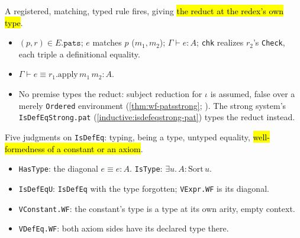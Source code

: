 \begin{definition}
\label{rule:isdefeq-pat}
\leanok
{}

 A registered, matching, typed rule fires, giving \hl{the reduct at the
redex's own type}.
\begin{itemize}
\item {} $(p,r)\in E.\texttt{pats}$; $e$ matches $p$ ($m_1,m_2$); $\Gamma\vdash e:A$;
  \texttt{chk} realizes $r_2$'s \texttt{Check}, each triple a definitional equality.
\item {} $\Gamma \vdash e \equiv r_1.\mathrm{apply}\,m_1\,m_2 : A$.
\item {} No premise types the reduct: subject reduction for $\iota$ is assumed,
  false over a merely \texttt{Ordered} environment (\ref{thm:wf-patsstrong};
  ). The strong system's
  \texttt{IsDefEqStrong.pat} (\ref{inductive:isdefeqstrong-pat}) types the reduct instead.
\end{itemize}
\end{definition}

\begin{definition}
\label{def:hastype-istype}
\leanok
{}

 Five judgments on \texttt{IsDefEq}: typing, being a type, untyped equality,
\hl{well-formedness of a constant or an axiom}.
\begin{itemize}
\item \texttt{HasType}: the diagonal $e\equiv e:A$. \texttt{IsType}: $\exists u.\,A:\mathrm{Sort}\,u$.
\item \texttt{IsDefEqU}: \texttt{IsDefEq} with the type forgotten; \texttt{VExpr.WF} is its
  diagonal.
\item \texttt{VConstant.WF}: the constant's type is a type at its own arity, empty context.
\item \texttt{VDefEq.WF}: both axiom sides have its declared type there.
\end{itemize}
\end{definition}

